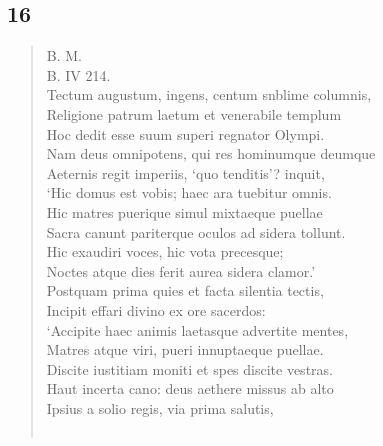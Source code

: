 \documentclass[11pt, a4paper]{report}
\begin{document}
            \subsection*{16}
      \begin{verse}
      B. M. \\ B. IV 214. \\ Tectum augustum, ingens, centum snblime columnis, \\ Religione patrum laetum et venerabile templum \\ Hoc dedit esse suum superi regnator Olympi. \\ Nam deus omnipotens, qui res hominumque deumque \\ Aeternis regit imperiis, ‘quo tenditis’? inquit, \\ ‘Hic domus est vobis; haec ara tuebitur omnis. \\ Hic matres puerique simul mixtaeque puellae \\ Sacra canunt pariterque oculos ad sidera tollunt. \\ Hic exaudiri voces, hic vota precesque; \\ Noctes atque dies ferit aurea sidera clamor.’ \\ Postquam prima quies et facta silentia tectis, \\ Incipit effari divino ex ore sacerdos: \\ ‘Accipite haec animis laetasque advertite mentes, \\ Matres atque viri, pueri innuptaeque puellae. \\ Discite iustitiam moniti et spes discite vestras. \\ Haut incerta cano: deus aethere missus ab alto \\ Ipsius a solio regis, via prima salutis, \\ 
        ﻿\pagebreak 

\end{verse}
\end{document}
